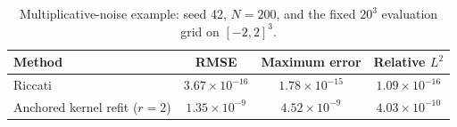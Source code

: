 \begin{table}[htbp]\centering
\caption{Multiplicative-noise example: seed 42, $N=200$, and the fixed $20^3$ evaluation grid on $[-2,2]^3$.}\label{tab:example3_comparison}
\begin{tabular}{lccc}\toprule Method & RMSE & Maximum error & Relative $L^2$\\\midrule
Riccati & $3.67\times10^{-16}$ & $1.78\times10^{-15}$ & $1.09\times10^{-16}$ \\
Anchored kernel refit ($r=2$) & $1.35\times10^{-9}$ & $4.52\times10^{-9}$ & $4.03\times10^{-10}$ \\\bottomrule\end{tabular}\end{table}
